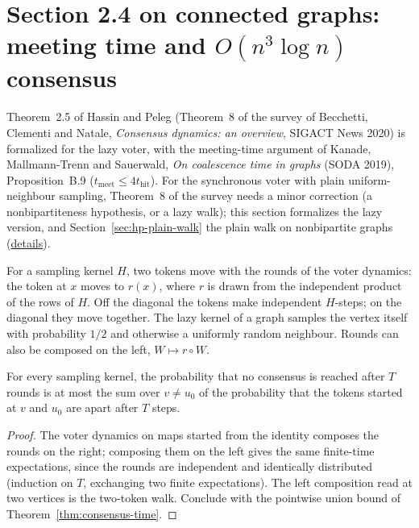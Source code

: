 \section{Section 2.4 on connected graphs: meeting time and $O(n^3\log n)$ consensus}\label{sec:kms-meeting-time}
Theorem~2.5 of Hassin and Peleg (Theorem~8 of the survey of Becchetti, Clementi and Natale,
\emph{Consensus dynamics: an overview}, SIGACT News 2020) is formalized for the lazy voter, with
the meeting-time argument of Kanade, Mallmann-Trenn and Sauerwald, \emph{On coalescence time in
graphs} (SODA 2019), Proposition~B.9 ($t_{\mathrm{meet}}\le 4t_{\mathrm{hit}}$). For the
synchronous voter with plain uniform-neighbour sampling, Theorem~8 of the survey needs a minor
correction (a nonbipartiteness hypothesis, or a lazy walk); this section formalizes the lazy
version, and Section~\ref{sec:hp-plain-walk} the plain walk on nonbipartite graphs
(\href{https://github.com/formal-dynamics/leanamics/blob/main/voter/FORMALIZATION_DIFFERENCES.md#41-survey-theorem-8-needs-a-minor-correction-the-lazy-walk-is-formalized}{details}).
\begin{definition}\label{def:pairwalk}
\leanok{}
For a sampling kernel $H$, two tokens move with the rounds of the voter dynamics: the
token at $x$ moves to $r(x)$, where $r$ is drawn from the independent product of the rows
of $H$. Off the diagonal the tokens make independent $H$-steps; on the diagonal they move
together. The lazy kernel of a graph samples the vertex itself with probability $1/2$ and
otherwise a uniformly random neighbour. Rounds can also be composed on the left,
$W\mapsto r\circ W$.
\end{definition}
\begin{lemma}\label{lem:duality-general}
\leanok{}
For every sampling kernel, the probability that no consensus is reached after $T$ rounds
is at most the sum over $v\neq u_0$ of the probability that the tokens started at $v$ and
$u_0$ are apart after $T$ steps.
\end{lemma}
\begin{proof}\leanok
The voter dynamics on maps started from the identity composes the rounds on the right;
composing them on the left gives the same finite-time expectations, since the rounds are
independent and identically distributed (induction on $T$, exchanging two finite
expectations). The left composition read at two vertices is the two-token walk. Conclude
with the pointwise union bound of Theorem~\ref{thm:consensus-time}.
\end{proof}
